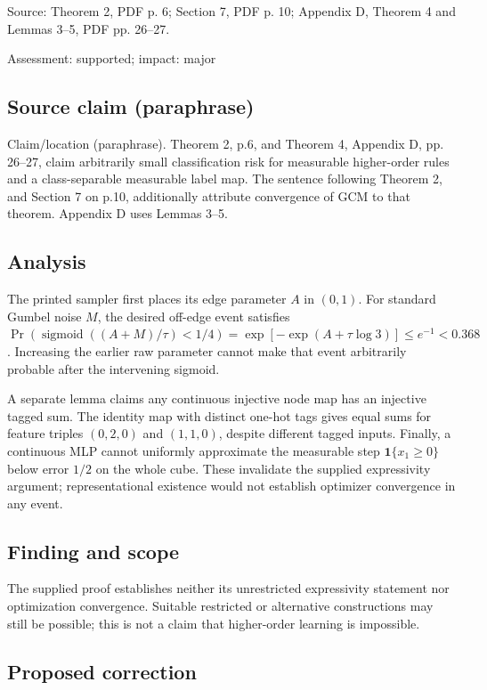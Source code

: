 \documentclass[11pt]{article}
\begin{document}
Source: Theorem 2, PDF p. 6; Section 7, PDF p. 10; Appendix D, Theorem 4 and Lemmas 3–5, PDF pp. 26–27.

Assessment: supported; impact: major

\subsection*{Source claim (paraphrase)}

Claim/location (paraphrase). Theorem 2, p.6, and Theorem 4, Appendix D, pp. 26–27, claim arbitrarily small classification risk for measurable higher-order rules and a class-separable measurable label map. The sentence following Theorem 2, and Section 7 on p.10, additionally attribute convergence of GCM to that theorem. Appendix D uses Lemmas 3–5.

\subsection*{Analysis}

The printed sampler first places its edge parameter \(A\) in \((0,1)\). For standard Gumbel noise \(M\), the desired off-edge event satisfies \(\Pr(\operatorname{sigmoid}((A+M)/\tau)<1/4)=\exp[-\exp(A+\tau\log3)]\le e^{-1}<0.368\). Increasing the earlier raw parameter cannot make that event arbitrarily probable after the intervening sigmoid.

A separate lemma claims any continuous injective node map has an injective tagged sum. The identity map with distinct one-hot tags gives equal sums for feature triples \((0,2,0)\) and \((1,1,0)\), despite different tagged inputs. Finally, a continuous MLP cannot uniformly approximate the measurable step \(\mathbf1\{x_1\ge0\}\) below error \(1/2\) on the whole cube. These invalidate the supplied expressivity argument; representational existence would not establish optimizer convergence in any event.

\subsection*{Finding and scope}

The supplied proof establishes neither its unrestricted expressivity statement nor optimization convergence. Suitable restricted or alternative constructions may still be possible; this is not a claim that higher-order learning is impossible.

\subsection*{Proposed correction}
\end{document}
